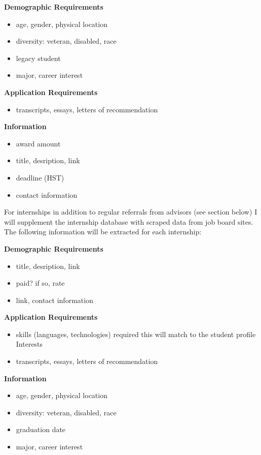 \documentclass[english]{proposalnsf}
\begin{document}
		\textbf{Demographic Requirements}
		\begin{itemize}
			\item age, gender, physical location
			\item diversity: veteran, disabled, race
			\item legacy student
			\item major, career interest
		\end{itemize}
	
			\textbf{Application Requirements}
		\begin{itemize}
			\item transcripts, essays, letters of recommendation
		\end{itemize}
		
		\textbf{Information}
		\begin{itemize}
			\item award amount
			\item title, desription, link
			\item deadline (HST)
			\item contact information
		\end{itemize}
		
		
		For internships in addition to regular referrals from advisors (see section below) I will supplement the internship database with scraped data from job board sites. The following information will be extracted for each internship:
		
		\textbf{Demographic Requirements}
		\begin{itemize}
			\item title, desription, link
			\item paid? if so, rate
			\item link, contact information
		\end{itemize}
		
		\textbf{Application Requirements}
		\begin{itemize}
			\item skills (languages, technologies) required
				\subitem this will match to the student profile Interests
			\item transcripts, essays, letters of recommendation
		\end{itemize}
	
		\textbf{Information}
		\begin{itemize}
			\item age, gender, physical location
			\item diversity: veteran, disabled, race
			\item graduation date
			\item major, career interest
		\end{itemize}
		
\end{document}
